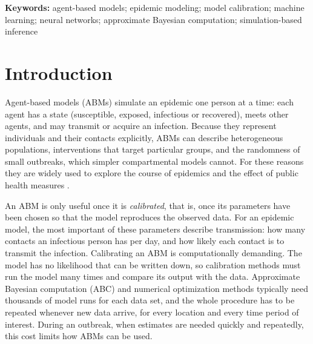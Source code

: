 \documentclass[12pt]{article}
\begin{document}
\begin{abstract}
\noindent\textbf{Conclusions.}
DeepIMC calibrates agent-based epidemic models accurately, reproduces the epidemic they describe,
and does so in a fraction of a second, with no settings to choose. Its advantage on real data
depends on how closely the data resemble the simulations it was trained on. The method, the trained
models and the comparison methods are available in the open-source R package
\texttt{epiworldRcalibrate}.
\end{abstract}

\noindent\textbf{Keywords:}
agent-based models; epidemic modeling; model calibration; machine learning; neural networks;
approximate Bayesian computation; simulation-based inference

\section{Introduction}

Agent-based models (ABMs) simulate an epidemic one person at a time: each agent has a state
(susceptible, exposed, infectious or recovered), meets other agents, and may transmit or acquire
an infection. Because they represent individuals and their contacts explicitly, ABMs can describe
heterogeneous populations, interventions that target particular groups, and the randomness of
small outbreaks, which simpler compartmental models cannot. For these reasons they are widely used
to explore the course of epidemics and the effect of public health measures
\autocite{railsbackAgentbasedIndividualbasedModeling2019}.

An ABM is only useful once it is \emph{calibrated}, that is, once its parameters have been chosen
so that the model reproduces the observed data. For an epidemic model, the most important of these
parameters describe transmission: how many contacts an infectious person has per day, and how
likely each contact is to transmit the infection. Calibrating an ABM is computationally demanding.
The model has no likelihood that can be written down, so calibration methods must run the model
many times and compare its output with the data. Approximate Bayesian computation (ABC) and
numerical optimization methods typically need thousands of model runs for each data set, and the
whole procedure has to be repeated whenever new data arrive, for every location and every time
period of interest. During an outbreak, when estimates are needed quickly and repeatedly, this cost
limits how ABMs can be used.
\end{document}
